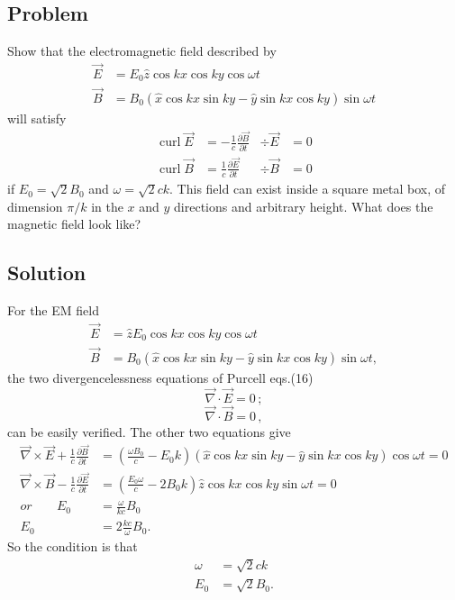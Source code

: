 \documentclass[solutions]{esg8022pset}
\DeclareMathOperator{\curl}{curl}
\begin{document}
\subsection{Problem}
  Show that the electromagnetic field described by
  \begin{align*}
    \vec E & = E_0 \hat z \cos kx \cos ky \cos \omega t \\
    \vec B & = B_0(\hat x \cos kx \sin ky - \hat y \sin kx \cos ky) \sin \omega t
  \end{align*}
  will satisfy
  \begin{align*}
    \curl \vec E & = -\frac{1}{c}\frac{\partial \vec B}{\partial t} &
      \div\vec E & = 0 \\
    \curl \vec B & = \frac{1}{c}\frac{\partial \vec E}{\partial t} &
      \div\vec B & = 0
  \end{align*}
  if $E_0 = \sqrt{2}B_0$ and $\omega = \sqrt{2}ck$. This field can exist
  inside a square metal box, of dimension $\pi / k$ in the $x$ and $y$ directions
  and arbitrary height. What does the magnetic field look like?
\subsection{Solution}
  For the EM field
  \begin{align}
  \vec{E} &= \hat{z}E_0 \cos kx\cos ky\cos \omega t\\
  \vec{B} &=
  B_0(\hat{x}\cos kx\sin ky-\hat{y}\sin kx\cos ky)\sin \omega t,
  \end{align}
  the two divergencelessness equations of Purcell eqs.(16)
  \[ \vec{\nabla}\cdot\vec{E}=0 \,;\]
  \[ \vec{\nabla}\cdot\vec{B}=0 \,,\]
  can be easily verified.  The other two equations give
  \begin{align}
  \vec{\nabla}\times\vec{E}+\frac{1}{c}\frac{\partial \vec{B}}{\partial
  t} &= (\frac{\omega B_0}{c}-E_0 k)(\hat{x}\cos kx\sin ky
  -\hat{y}\sin kx \cos ky)\cos \omega t =0\nonumber\\
  \vec{\nabla}\times\vec{B}-\frac{1}{c}\frac{\partial \vec{E}}{\partial
  t} &= (\frac{E_0\omega}{c}-2B_0 k)\hat{z}\cos kx \cos ky \sin \omega
  t =0\nonumber\\
  or\;\;\;\;\;\;\; E_0 &= \frac{\omega}{kc}B_0\\
  E_0 &= 2\frac{kc}{\omega}B_0.
  \end{align}
  So the condition is that
  \begin{align}
  \omega &= \sqrt{2} ck\\
  E_0 &= \sqrt{2} B_0.
  \end{align}
\end{document}
